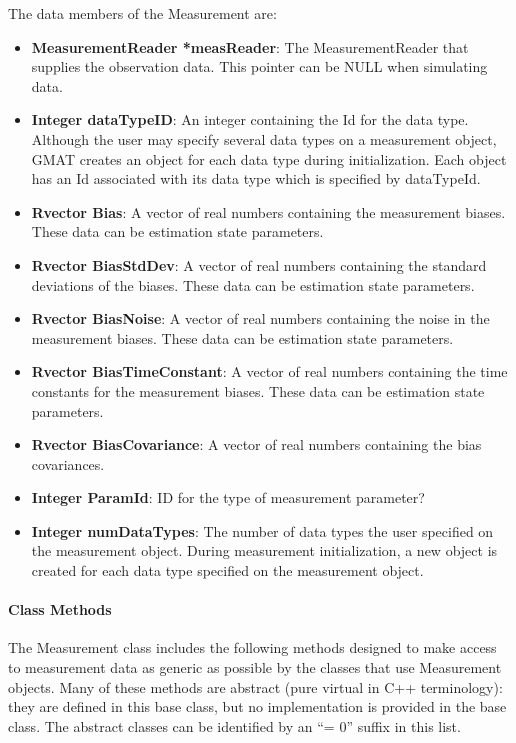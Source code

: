 The data members of the Measurement are:

\begin{itemize}
\item \textbf{MeasurementReader *measReader}:  The MeasurementReader that supplies the observation data. This pointer can be NULL when simulating data.
\item \textbf{Integer dataTypeID}:   An integer containing the Id for the data type.  Although the user may specify several data types on a measurement object, GMAT creates an object for each data type during initialization.  Each object has an Id associated with its data type which is specified by dataTypeId.
\item \textbf{Rvector Bias}:  A vector of real numbers containing the measurement biases.  These data can be estimation state parameters.
\item \textbf{Rvector BiasStdDev}:  A vector of real numbers containing the standard deviations of the biases. These data can be estimation state parameters.
\item \textbf{Rvector BiasNoise}:  A vector of real numbers containing the noise in the measurement biases. These data can be estimation state parameters.
\item \textbf{Rvector BiasTimeConstant}:  A vector of real numbers containing the time constants for the measurement biases. These data can be estimation state parameters.
\item \textbf{Rvector BiasCovariance}:  A vector of real numbers containing the bias covariances.
\item \textbf{Integer ParamId}:  ID for the type of measurement parameter?
\item \textbf{Integer numDataTypes}:  The number of data types the user specified on the measurement object. During measurement initialization, a new object is created for each data type specified on the measurement object.
\end{itemize}

\paragraph{Class Methods}

The Measurement class includes the following methods designed to make access to measurement data as generic as possible by the classes that use Measurement objects.  Many of these methods are abstract (pure virtual in C++ terminology): they are defined in this base class, but no implementation is provided in the base class.  The abstract classes can be identified by an ``= 0'' suffix in this list.

